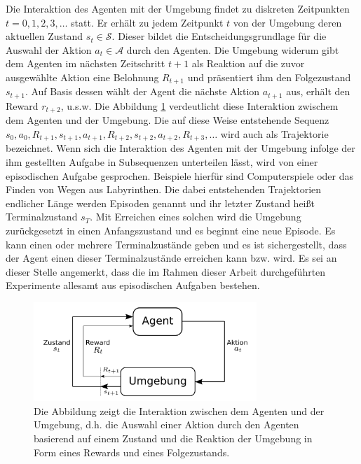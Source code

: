 Die Interaktion des Agenten mit der Umgebung findet zu diskreten Zeitpunkten $t = 0, 1, 2, 3,\dots$ statt. Er erhält zu jedem Zeitpunkt $t$ von der Umgebung deren aktuellen Zustand $s_t \in \mathcal{S}$. Dieser bildet die Entscheidungsgrundlage für die Auswahl der Aktion $a_t \in \mathcal{A}$ durch den Agenten. Die Umgebung widerum gibt dem Agenten im nächsten Zeitschritt $t+1$ als Reaktion auf die zuvor ausgewählte Aktion eine Belohnung $R_{t+1}$ und präsentiert ihm den Folgezustand $s_{t+1}$. Auf Basis dessen wählt der Agent die nächste Aktion $a_{t+1}$ aus, erhält den Reward $r_{t+2}$, u.s.w. Die Abbildung \ref{fig_schnittstelle} verdeutlicht diese Interaktion zwischem dem Agenten und der Umgebung. Die auf diese Weise entstehende Sequenz $s_0, a_0, R_{t+1}, s_{t+1}, a_{t+1}, R_{t+2}, s_{t+2}, a_{t+2}, R_{t+3},\dots$ wird auch als Trajektorie bezeichnet. Wenn sich die Interaktion des Agenten mit der Umgebung infolge der ihm gestellten Aufgabe in Subsequenzen unterteilen lässt, wird von einer episodischen Aufgabe gesprochen. Beispiele hierfür sind Computerspiele oder das Finden von Wegen aus Labyrinthen. Die dabei entstehenden Trajektorien endlicher Länge werden Episoden genannt und ihr letzter Zustand heißt Terminalzustand $s_T$. Mit Erreichen eines solchen wird die Umgebung zurückgesetzt in einen Anfangszustand und es beginnt eine neue Episode. Es kann einen oder mehrere Terminalzustände geben und es ist sichergestellt, dass der Agent einen dieser Terminalzustände erreichen kann bzw. wird. Es sei an dieser Stelle angemerkt, dass die im Rahmen dieser Arbeit durchgeführten Experimente allesamt aus episodischen Aufgaben bestehen.

\begin{figure}[ht!]
  \centering
  \includegraphics[keepaspectratio,width=0.75\textwidth]{abbildungen/schnittstelle_agent_umgebung.pdf}
  \caption{Die Abbildung zeigt die Interaktion zwischen dem Agenten und der Umgebung, d.h. die Auswahl einer Aktion durch den Agenten basierend auf einem Zustand und die Reaktion der Umgebung in Form eines Rewards und eines Folgezustands.}
  \label{fig_schnittstelle}
\end{figure}


